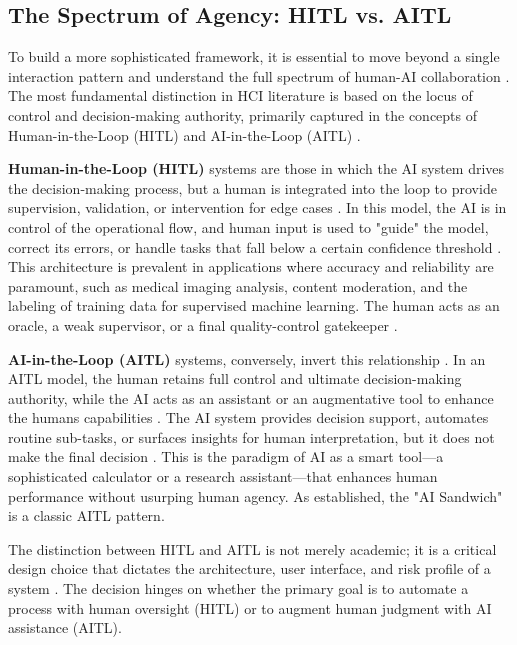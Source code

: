 \documentclass[
  12pt,
  a4paper,
  bibliography=totoc,
  numbers=noenddot
]{scrartcl}
\begin{document}
\subsection{The Spectrum of Agency: HITL
vs.
AITL}\label{the-spectrum-of-agency-hitl-vs.-aitl}

To build a more sophisticated framework, it is essential to move beyond
a single interaction pattern and understand the full spectrum of
human-AI collaboration \cite{researchgate2025collaboration}. The most fundamental distinction in HCI
literature is based on the locus of control and decision-making
authority, primarily captured in the concepts of Human-in-the-Loop
(HITL) and AI-in-the-Loop (AITL) \cite{arxiv2025human}.

\textbf{Human-in-the-Loop (HITL)} systems are those in which the AI
system drives the decision-making process, but a human is integrated
into the loop to provide supervision, validation, or intervention for
edge cases \cite{arxiv2025human}. In this model, the AI is in control of
the operational flow, and human input is used to "guide" the model,
correct its errors, or handle tasks that fall below a certain confidence
threshold \cite{arxiv2025human}. This architecture is prevalent in
applications where accuracy and reliability are paramount, such as
medical imaging analysis, content moderation, and the labeling of
training data for supervised machine learning.\cite{googlecloud2025hitl} The
human acts as an oracle, a weak supervisor, or a final quality-control
gatekeeper \cite{arxiv2025human}.

\textbf{AI-in-the-Loop (AITL)} systems, conversely, invert this
relationship \cite{arxiv2025human}. In an AITL model, the human retains
full control and ultimate decision-making authority, while the AI acts
as an assistant or an augmentative tool to enhance the
human\textquotesingle s capabilities \cite{arxiv2025human}. The AI system
provides decision support, automates routine sub-tasks, or surfaces
insights for human interpretation, but it does not make the final
decision \cite{ibm2025ai}. This is the paradigm of AI as a smart
tool---a sophisticated calculator or a research assistant---that
enhances human performance without usurping human agency. As
established, the "AI Sandwich" is a classic AITL pattern.

The distinction between HITL and AITL is not merely academic; it is a
critical design choice that dictates the architecture, user interface,
and risk profile of a system \cite{arxiv2025human}. The decision hinges on
whether the primary goal is to automate a process with human oversight
(HITL) or to augment human judgment with AI assistance (AITL).
\end{document}
